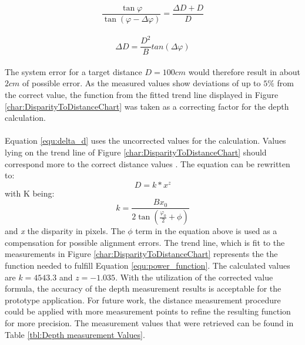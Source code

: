\begin{equation}
\frac{\tan \varphi}{\tan(\varphi -\Delta\varphi)}=\frac{\Delta D+D}{D}
\end{equation}\\
\begin{equation}
\label{equ:delta_d}
\Delta D=\frac{D^{2}}{B} tan(\Delta\varphi)
\end{equation}
\\The system error for a target distance $D=100cm$ would therefore result in about $2cm$ of possible error.
As the measured values show deviations of up to $5\%$ from the correct value, the function from the fitted trend line displayed in Figure \ref{char:DisparityToDistanceChart} was taken as a correcting factor for the depth calculation.
\\\\Equation \ref{equ:delta_d} uses the uncorrected values for the calculation. Values lying on the trend line of Figure \ref{char:DisparityToDistanceChart} should correspond more to the correct distance values \cite{ManafA.Mahammed.2013}. The equation can be rewritten to:
\begin{equation}
\label{equ:power_function}
D=k*x^{z}
\end{equation}
with K being:
\begin{equation}
k=\frac{Bx_0}{2\tan(\frac{\varphi_0}{2}+\phi)}
\end{equation}
and \textit{x} the disparity in pixels.
The $\phi$ term in the equation above is used as a compensation for possible alignment errors.
The trend line, which is fit to the measurements in Figure \ref{char:DisparityToDistanceChart} represents the the function needed to fulfill Equation \ref{equ:power_function}. The calculated values are $k=4543.3$ and $z=-1.035$.
With the utilization of the corrected value formula, the accuracy of the depth measurement results is acceptable for the prototype application. For future work, the distance measurement procedure could be applied with more measurement points to refine the resulting function for more precision. The measurement values that were retrieved can be found in Table \ref{tbl:Depth measurement Values}.
\newpage

